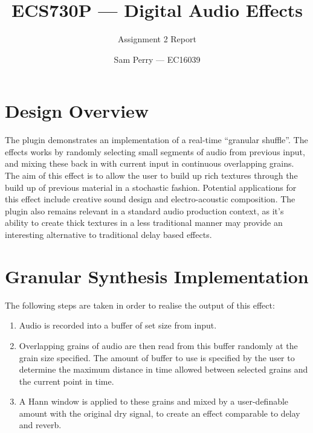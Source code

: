 \documentclass[titlepage]{scrartcl}
\begin{document}
\title{ECS730P --- Digital Audio Effects}
\subtitle{\LARGE{Assignment 2 Report}}
\author{Sam Perry --- EC16039}

\maketitle

\section{Design Overview}
The plugin demonstrates an implementation of a real-time ``granular shuffle''.
The effects works by randomly selecting small segments of audio from previous
input, and mixing these back in with current input in continuous overlapping
grains. The aim of this effect is to allow the user to build up rich textures
through the build up of previous material in a stochastic fashion. Potential
applications for this effect include creative sound design and electro-acoustic
composition. The plugin also remains relevant in a standard audio production
context, as it's ability to create thick textures in a less traditional manner
may provide an interesting alternative to traditional delay based effects.

\section{Granular Synthesis Implementation}
The following steps are taken in order to realise the output of this effect:
\begin{enumerate}
    \item Audio is recorded into a buffer of set size from input.
    \item Overlapping grains of audio are then read from this buffer randomly
        at the grain size specified. The amount of buffer to use is specified
        by the user to determine the maximum distance in time allowed between
        selected grains and the current point in time.
    \item A Hann window is applied to these grains and mixed by a
        user-definable amount with the original dry signal, to create an effect
        comparable to delay and reverb.
\end{enumerate}
\end{document}
